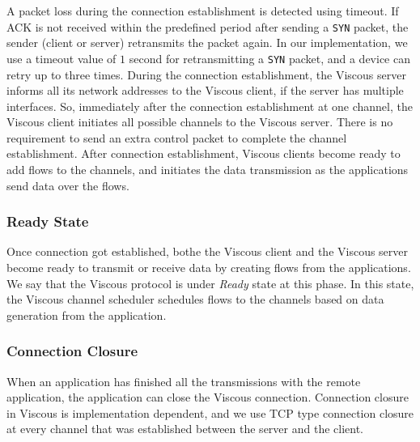 A packet loss during the connection establishment is detected using timeout. If ACK is not received within the predefined period after sending a \texttt{SYN} packet, the sender (client or server) retransmits the packet again. In our implementation, we use a timeout value of $1$ second for retransmitting a \texttt{SYN} packet, and a device can retry up to three times. During the connection establishment, the Viscous server informs all its network addresses to the Viscous client, if the server has multiple interfaces. So, immediately after the connection establishment at one channel, the Viscous client initiates all possible channels to the Viscous server. There is no requirement to send an extra control packet to complete the channel establishment. 
After connection establishment, Viscous clients become ready to add flows to the channels, and initiates the data transmission as the applications send data over the flows.

\subsubsection{Ready State}
Once connection got established, bothe the Viscous client and the Viscous server become ready to transmit or receive data by creating flows from the applications. We say that the Viscous protocol is under \textit{Ready} state at this phase. In this state, the Viscous channel scheduler schedules flows to the channels based on data generation from the application. 

\subsubsection{Connection Closure}
When an application has finished all the transmissions with the remote application, the application can close the Viscous connection. Connection closure in Viscous is implementation dependent, and we use TCP type connection closure at every channel that was established between the server and the client. 

